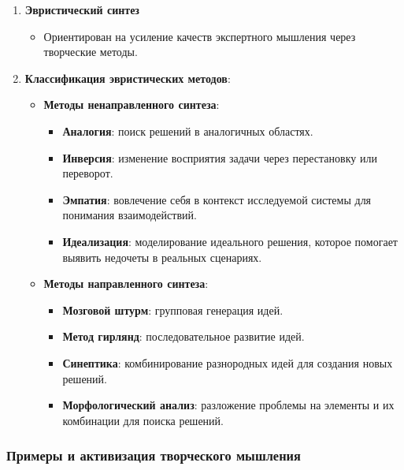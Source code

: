 \documentclass[
]{article}
\providecommand{\tightlist}{%
  \setlength{\itemsep}{0pt}\setlength{\parskip}{0pt}}
\begin{document}
\begin{enumerate}
\def\labelenumi{\arabic{enumi}.}
\item
  \textbf{Эвристический синтез}

  \begin{itemize}
  \tightlist
  \item
    Ориентирован на усиление качеств экспертного мышления через
    творческие методы.
  \end{itemize}
\item
  \textbf{Классификация эвристических методов}:

  \begin{itemize}
  \item
    \textbf{Методы ненаправленного синтеза}:

    \begin{itemize}
    \tightlist
    \item
      \textbf{Аналогия}: поиск решений в аналогичных областях.
    \item
      \textbf{Инверсия}: изменение восприятия задачи через перестановку
      или переворот.
    \item
      \textbf{Эмпатия}: вовлечение себя в контекст исследуемой системы
      для понимания взаимодействий.
    \item
      \textbf{Идеализация}: моделирование идеального решения, которое
      помогает выявить недочеты в реальных сценариях.
    \end{itemize}
  \item
    \textbf{Методы направленного синтеза}:

    \begin{itemize}
    \tightlist
    \item
      \textbf{Мозговой штурм}: групповая генерация идей.
    \item
      \textbf{Метод гирлянд}: последовательное развитие идей.
    \item
      \textbf{Синептика}: комбинирование разнородных идей для создания
      новых решений.
    \item
      \textbf{Морфологический анализ}: разложение проблемы на элементы и
      их комбинации для поиска решений.
    \end{itemize}
  \end{itemize}
\end{enumerate}

\subsubsection{\texorpdfstring{\textbf{Примеры и активизация творческого
мышления}}{Примеры и активизация творческого мышления}}\label{ux43fux440ux438ux43cux435ux440ux44b-ux438-ux430ux43aux442ux438ux432ux438ux437ux430ux446ux438ux44f-ux442ux432ux43eux440ux447ux435ux441ux43aux43eux433ux43e-ux43cux44bux448ux43bux435ux43dux438ux44f}
\end{document}
